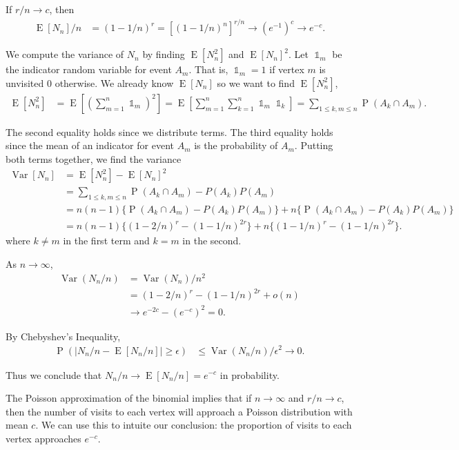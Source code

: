 \documentclass[12pt]{article}
\theoremstyle{definition}
\DeclareMathOperator{\E}{\mathrm{E}}		     %
\DeclareMathOperator{\Var}{\mathrm{Var}}         %
\DeclareMathOperator{\I}{\mathbb{1}}         %
\DeclareMathOperator{\pr}{\mathrm{P}}		     %
\begin{document}
If $r/n \rightarrow c$, then
\begin{align}
\E[N_n]/n &= (1-1/n)^r = [(1-1/n)^n]^{r/n} \rightarrow (e^{-1})^c
\rightarrow e^{-c}. \nonumber
\end{align}

We compute the variance of $N_n$ by finding $\E[N_n^2]$ and $\E[N_n]^2$.
Let $\I_m$ be the indicator random variable for event $A_m$.
That is, $\I_m = 1$ if vertex $m$ is unvisited 0 otherwise.
We already know $\E[N_n]$ so we want to find $\E[N_n^2]$,
\begin{align}
\E[N_n^2] &= \E \left[ \left(\sum_{m=1}^n \I_m \right) ^2 \right] =
\E \left[ \sum_{m=1}^n \sum_{k=1}^n \I_m \I_k \right] =
\sum_{1 \leq k, m \leq n} \pr(A_k \cap A_m). \nonumber
\end{align}

The second equality holds since we distribute terms.
The third equality holds since the mean of an indicator for event $A_m$
is the probability of $A_m$.
Putting both terms together, we find the variance
\begin{align}
\Var[N_n] &= \E[N_n^2] - \E[N_n]^2 \nonumber \\
&= \sum_{1 \leq k, m \leq n} \pr(A_k \cap A_m) - P(A_k)P(A_m) \nonumber \\
&= n(n-1) \{ \pr(A_k \cap A_m) - P(A_k)P(A_m) \} + 
n \{ \pr(A_k \cap A_m) - P(A_k)P(A_m) \} \nonumber \\
&= n(n-1) \{ (1-2/n)^r - (1-1/n)^{2r} \} + 
n \{ (1-1/n)^r  - (1-1/n)^{2r} \}. \nonumber
\end{align}
where $k\neq m$ in the first term and $k=m$ in the second.

As $n \rightarrow \infty$,
\begin{align}
\Var(N_n/n) &= \Var(N_n) / n^2 \nonumber\\
&= (1-2/n)^r - (1-1/n)^{2r} + o(n) \nonumber\\
&\rightarrow e^{-2c} - (e^{-c})^2 = 0. \nonumber
\end{align}

By Chebyshev's Inequality,
\begin{align}
\pr \left( |N_n/n - \E[N_n/n]| \geq \epsilon \right) &\leq \Var(N_n/n) / \epsilon^2
\rightarrow 0. \nonumber
\end{align}

Thus we conclude that $N_n/n \rightarrow \E[N_n/n] = e^{-c}$ in probability. 

The Poisson approximation of the binomial implies that if $n \rightarrow \infty$
and $r/n \rightarrow c$, then the number of visits to each vertex will approach
a Poisson distribution with mean $c$.
We can use this to intuite our conclusion: the proportion of visits to each vertex
approaches $e^{-c}$.
\end{document}
